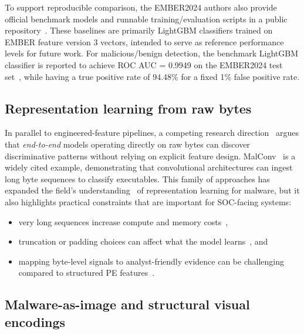 \documentclass[conference]{IEEEtran}
\begin{document}
To support reproducible comparison, the EMBER2024 authors also provide official benchmark models and runnable training/evaluation scripts in a public repository~\cite{JMGPR2024,ember2024github}.
These baselines are primarily LightGBM classifiers trained on EMBER feature version 3 vectors, intended to serve as reference performance levels for future work.
For malicious/benign detection, the benchmark LightGBM classifier is reported to achieve ROC AUC = 0.9949 on the EMBER2024 test set~\cite{JMGPR2024},
while having a true positive rate of 94.48\% for a fixed 1\% false positive rate.

\subsection{Representation learning from raw bytes} %

In parallel to engineered-feature pipelines, a competing research direction~\cite{RBSBCN2017,KBSSSK2025} argues that \emph{end-to-end} models operating directly on raw bytes can discover discriminative patterns without relying on explicit feature design.
MalConv~\cite{RBSBCN2017} is a widely cited example, demonstrating that convolutional architectures can ingest long byte sequences to classify executables.
This family of approaches has expanded the field's understanding~\cite{RCEJH2025,KBSSSK2025} of representation learning for malware, but it also highlights practical constraints that are important for SOC-facing systems:
\begin{itemize}
\item 
very long sequences increase compute and memory costs~\cite{EDS2020}, 
\item
truncation or padding choices can affect what the model learns~\cite{RBSBCN2017,AQPWPWCR2022}, and 
\item
mapping byte-level signals to analyst-friendly evidence can be challenging compared to structured PE features~\cite{NSDSP2025,AQPWPWCR2022}. 
\end{itemize}


\subsection{Malware-as-image and structural visual encodings}
\end{document}
